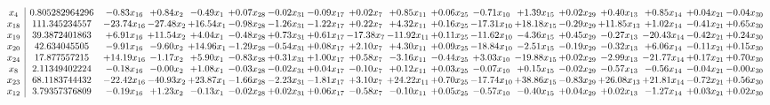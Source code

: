\documentclass[9pt]{article}
\begin{document}
 \[\begin{array}{c| c c@{\hskip 2pt} c@{\hskip 2pt} c@{\hskip 2pt} c@{\hskip 2pt} c@{\hskip 2pt} c@{\hskip 2pt} c@{\hskip 2pt} c@{\hskip 2pt} c@{\hskip 2pt} c@{\hskip 2pt} c@{\hskip 2pt} c@{\hskip 2pt} c@{\hskip 2pt} c@{\hskip 2pt} c@{\hskip 2pt} c@{\hskip 2pt} }
 x_{4}   &  0.805282964296 & -0.83 x_{16} & +  0.84 x_{2} & -0.49 x_{1} & +  0.07 x_{28} & -0.02 x_{31} & -0.09 x_{17} & +  0.02 x_{7} & +  0.85 x_{11} & +  0.06 x_{25} & -0.71 x_{10} & +  1.39 x_{15} & +  0.02 x_{29} & +  0.40 x_{13} & +  0.85 x_{14} & +  0.04 x_{21} & -0.04 x_{30}\\
 x_{18}   &  111.345234557 & -23.74 x_{16} & -27.48 x_{2} & + 16.54 x_{1} & -0.98 x_{28} & -1.26 x_{31} & -1.22 x_{17} & +  0.22 x_{7} & +  4.32 x_{11} & +  0.16 x_{25} & -17.31 x_{10} & + 18.18 x_{15} & -0.29 x_{29} & + 11.85 x_{13} & +  1.02 x_{14} & -0.41 x_{21} & +  0.65 x_{30}\\
 x_{19}   &  39.3872401863 & +  6.91 x_{16} & + 11.54 x_{2} & +  4.04 x_{1} & -0.48 x_{28} & +  0.73 x_{31} & +  0.61 x_{17} & -17.38 x_{7} & -11.92 x_{11} & +  0.11 x_{25} & -11.62 x_{10} & -4.36 x_{15} & +  0.45 x_{29} & -0.27 x_{13} & -20.43 x_{14} & -0.42 x_{21} & +  0.24 x_{30}\\
 x_{20}   &  42.634045505 & -9.91 x_{16} & -9.60 x_{2} & + 14.96 x_{1} & -1.29 x_{28} & -0.54 x_{31} & +  0.08 x_{17} & +  2.10 x_{7} & +  4.30 x_{11} & +  0.09 x_{25} & -18.84 x_{10} & -2.51 x_{15} & -0.19 x_{29} & -0.32 x_{13} & +  6.06 x_{14} & -0.11 x_{21} & +  0.15 x_{30}\\
 x_{24}   &  17.877557215 & + 14.19 x_{16} & -1.17 x_{2} & +  5.90 x_{1} & -0.83 x_{28} & +  0.31 x_{31} & +  1.00 x_{17} & +  0.58 x_{7} & -3.16 x_{11} & -0.44 x_{25} & +  3.03 x_{10} & -19.88 x_{15} & +  0.02 x_{29} & -2.99 x_{13} & -21.77 x_{14} & +  0.17 x_{21} & +  0.70 x_{30}\\
 x_{8}   &  2.11349402224 & -0.18 x_{16} & -0.00 x_{2} & +  1.08 x_{1} & -0.03 x_{28} & -0.02 x_{31} & +  0.04 x_{17} & -0.10 x_{7} & +  0.12 x_{11} & +  0.03 x_{25} & -0.07 x_{10} & +  0.15 x_{15} & -0.02 x_{29} & -0.57 x_{13} & -0.56 x_{14} & -0.04 x_{21} & -0.00 x_{30}\\
 x_{23}   &  68.1183744432 & -22.42 x_{16} & -40.93 x_{2} & + 23.87 x_{1} & -1.66 x_{28} & -2.23 x_{31} & -1.81 x_{17} & +  3.10 x_{7} & + 24.22 x_{11} & +  0.70 x_{25} & -17.74 x_{10} & + 38.86 x_{15} & -0.83 x_{29} & + 26.08 x_{13} & + 21.81 x_{14} & -0.72 x_{21} & +  0.56 x_{30}\\
 x_{12}   &  3.79357376809 & -0.19 x_{16} & +  1.23 x_{2} & -0.13 x_{1} & -0.02 x_{28} & +  0.02 x_{31} & +  0.06 x_{17} & -0.58 x_{7} & -0.10 x_{11} & +  0.05 x_{25} & -0.57 x_{10} & -0.40 x_{15} & +  0.04 x_{29} & +  0.02 x_{13} & -1.27 x_{14} & +  0.03 x_{21} & +  0.02 x_{30}\\

\end{array}\]
\end{document}
